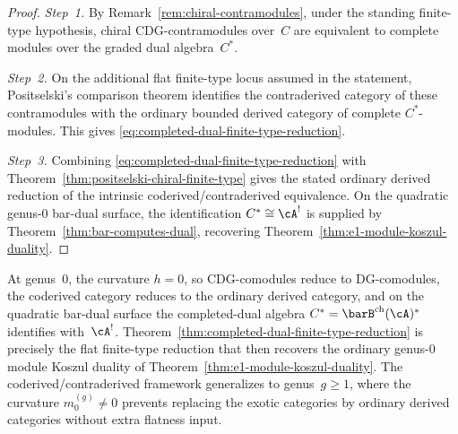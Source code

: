 \begin{proof}
\emph{Step~1.}
By Remark~\ref{rem:chiral-contramodules}, under the standing
finite-type hypothesis, chiral CDG-contramodules over~$C$ are
equivalent to complete modules over the graded dual algebra~$C^*$.

\emph{Step~2.}
On the additional flat finite-type locus assumed in the statement,
Positselski's comparison theorem
\cite[\S4.5, Theorem~4.5.1]{Positselski11} identifies the
contraderived category of these contramodules with the ordinary
bounded derived category of complete $C^*$-modules. This gives
\eqref{eq:completed-dual-finite-type-reduction}.

\emph{Step~3.}
Combining \eqref{eq:completed-dual-finite-type-reduction} with
Theorem~\ref{thm:positselski-chiral-finite-type} gives the stated ordinary
derived reduction of the intrinsic coderived/contraderived
equivalence. On the quadratic genus-$0$ bar-dual surface, the
identification $C^*\cong \cA^!$ is supplied by
Theorem~\ref{thm:bar-computes-dual}, recovering
Theorem~\ref{thm:e1-module-koszul-duality}.
\end{proof}

\begin{remark}
\label{rem:genus-0-recovery}
At genus~$0$, the curvature $h = 0$, so CDG-comodules reduce to
DG-comodules, the coderived category reduces to the ordinary derived
category, and on the quadratic bar-dual surface the completed-dual
algebra $C^*=\barB^{\mathrm{ch}}(\cA)^*$ identifies with~$\cA^!$.
Theorem~\ref{thm:completed-dual-finite-type-reduction} is precisely the
flat finite-type reduction that then recovers the ordinary
genus-$0$ module Koszul duality of
Theorem~\ref{thm:e1-module-koszul-duality}.
The coderived/contraderived framework generalizes to genus~$g \geq 1$, where the
curvature $m_0^{(g)} \neq 0$ prevents replacing the exotic
categories by ordinary derived categories without extra flatness input.
\end{remark}

